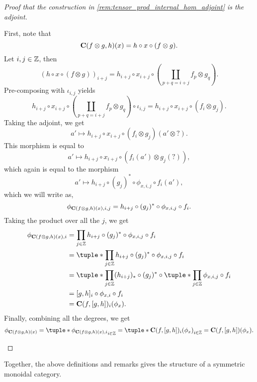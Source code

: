 \begin{proof}[Proof that the construction in \autoref{rem:tensor_prod_internal_hom_adjoint} is the adjoint]
\begin{enumerate}
{            First, note that
            \[
                \operatorname{\mathbf{C}}(f \otimes g, h)(x) = h \circ x \circ (f \otimes g).
            \]
            Let \( i, j \in {\mathbb{Z}} \), then
            \[
                (h \circ x \circ (f \otimes g))_{i + j} = h_{i + j} \circ x_{i + j} \circ (\coprod_{p + q = i + j} f_p \otimes g_q).
            \]
            Pre-composing with \( \iota_{i, j} \) yields
            \[
                h_{i + j} \circ x_{i + j} \circ (\coprod_{p + q = i + j} f_p \otimes g_q) \circ \iota_{i, j} = h_{i + j} \circ x_{i + j} \circ (f_i \otimes g_j).
            \]
            Taking the adjoint, we get
            \[
                a' \mapsto h_{i + j} \circ x_{i + j} \circ (f_i \otimes g_j)(a' \otimes ?).
            \]
            This morphism is equal to
            \[
                a' \mapsto h_{i + j} \circ x_{i + j} \circ (f_i (a') \otimes g_j(?)),
            \]
            which again is equal to the morphism
            \[
                a' \mapsto h_{i + j} \circ (g_j)^* \circ \phi_{x, i, j} \circ f_i(a'),
            \]
            which we will write as,
            \[
                \phi_{\operatorname{\mathbf{C}}(f \otimes g, h)(x), i, j} = h_{i + j} \circ (g_j)^* \circ \phi_{x, i, j} \circ f_i.
            \]
            Taking the product over all the \( j \), we get
            \begin{align*}
                \phi_{\C(f \otimes g, h) (x), i} &= \prod_{j \in \Zb} h_{i + j} \circ (g_j)^* \circ \phi_{x, i, j} \circ f_i \\
                &= \tuple*{\prod_{j \in \Zb} h_{i + j} \circ (g_j)^* \circ \phi_{x, i, j}} \circ f_i \\
                &= \tuple*{\prod_{j \in \Zb} (h_{i + j})_* \circ (g_j)^*} \circ \tuple*{\prod_{j \in \Zb} \phi_{x, i, j}} \circ f_i \\
                &= [g, h]_i \circ \phi_{x, i} \circ f_i \\
                &= \C(f, [g, h])_i (\phi_x).
            \end{align*}
            Finally, combining all the degrees, we get
            \[
                \phi_{\C(f \otimes g, h) (x)} = \tuple*{\phi_{\C(f \otimes g, h) (x), i}}_{i \in \Zb} = \tuple*{\C(f, [g, h])_i (\phi_x)}_{i \in \Zb} = \C(f, [g, h]) (\phi_x). \qedhere
            \]
        }
    \end{enumerate}
\end{proof}

Together, the above definitions and remarks gives the structure of a symmetric monoidal category.

